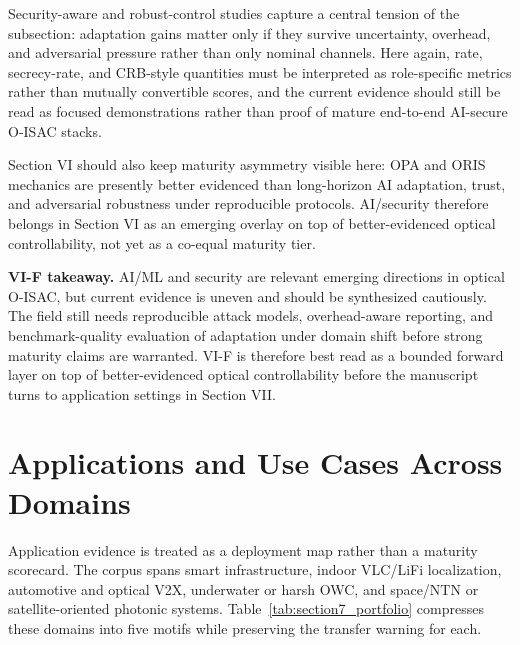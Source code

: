 \documentclass[letterpaper,journal]{IEEEtran}
\begin{document}
Security-aware and robust-control studies capture a central tension of the subsection: adaptation gains matter only if they survive uncertainty, overhead, and adversarial pressure rather than only nominal channels. Here again, rate, secrecy-rate, and CRB-style quantities must be interpreted as role-specific metrics rather than mutually convertible scores, and the current evidence should still be read as focused demonstrations rather than proof of mature end-to-end AI-secure O-ISAC stacks.

Section VI should also keep maturity asymmetry visible here: OPA and ORIS mechanics are presently better evidenced than long-horizon AI adaptation, trust, and adversarial robustness under reproducible protocols. AI/security therefore belongs in Section VI as an emerging overlay on top of better-evidenced optical controllability, not yet as a co-equal maturity tier.

\textbf{VI-F takeaway.} AI/ML and security are relevant emerging directions in optical O-ISAC, but current evidence is uneven and should be synthesized cautiously. The field still needs reproducible attack models, overhead-aware reporting, and benchmark-quality evaluation of adaptation under domain shift before strong maturity claims are warranted. VI-F is therefore best read as a bounded forward layer on top of better-evidenced optical controllability before the manuscript turns to application settings in Section VII.

\section{Applications and Use Cases Across Domains}
\label{sec:applications}

Application evidence is treated as a deployment map rather than a maturity scorecard. The corpus spans smart infrastructure, indoor VLC/LiFi localization, automotive and optical V2X, underwater or harsh OWC, and space/NTN or satellite-oriented photonic systems. Table~\ref{tab:section7_portfolio} compresses these domains into five motifs while preserving the transfer warning for each.
\end{document}
